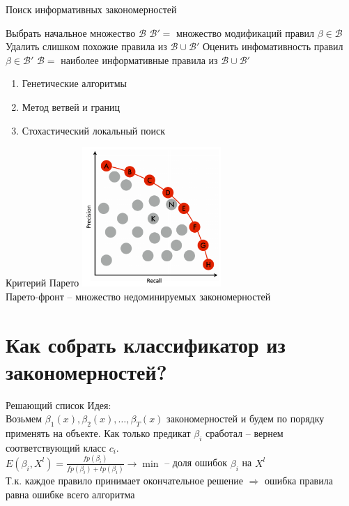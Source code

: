 \documentclass[10pt]{beamer}
\begin{document}
\begin{frame}{Поиск информативных закономерностей}
  \begin{algorithmic}[1]
    \State Выбрать начальное множество $\mathcal{B}$
      \State $\mathcal{B}'=$ множество модификаций правил $\beta \in \mathcal{B}$
      \State Удалить слишком похожие правила из $\mathcal{B} \cup \mathcal{B}'$
      \State Оценить инфомативность правил $\beta \in \mathcal{B}'$
      \State $\mathcal{B}=$ наиболее информативные правила из $\mathcal{B} \cup \mathcal{B}'$
    \EndRepeat
  \EndFunction
  \end{algorithmic}    
\end{frame}

\begin{frame}
	\begin{enumerate}[--]
		\item Генетические алгоритмы
		\item Метод ветвей и границ	
		\item Стохастический локальный поиск	
	\end{enumerate}
\end{frame}

\begin{frame}{Критерий Парето}
  \includegraphics[height=150pt, keepaspectratio = true]{images/pareto}   \\
  Парето-фронт -- множество недоминируемых закономерностей
\end{frame}

\section{Как собрать классификатор из закономерностей?}

\begin{frame}{Решающий список}
	\alert{Идея}:\\
	Возьмем $\beta_1(x), \beta_2(x), \dots, \beta_T(x)$ закономерностей и будем по порядку применять на объекте. 
	Как только предикат $\beta_i$ сработал -- вернем соответствующий класс $c_i$.\\
	\bigbreak
	\pause
	$E(\beta_i, X^l) = \frac{fp(\beta_i)}{fp(\beta_i)+tp(\beta_i)} \rightarrow \min$ -- доля ошибок $\beta_i$ на $X^l$\\
	\bigbreak
	Т.к. каждое правило принимает окончательное решение $\Rightarrow$ ошибка правила равна ошибке всего алгоритма
\end{frame}
\end{document}
